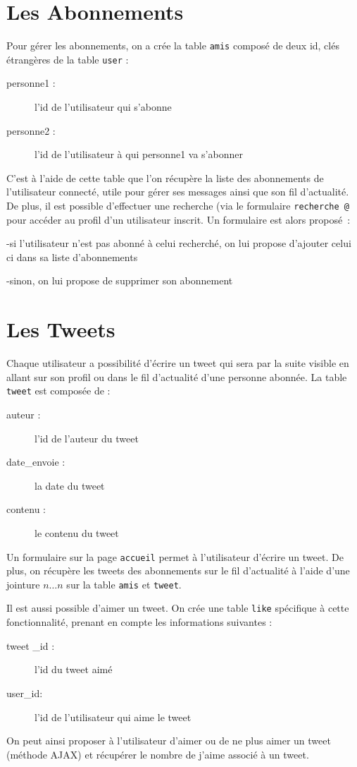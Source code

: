 \documentclass[a4paper, 12pt]{article}
\begin{document}
\section{Les Abonnements}	

Pour gérer les abonnements, on a crée la table \texttt{amis} composé de deux id, clés étrangères de la table \texttt{user} :
\begin{description}
\item[personne1 :] l’id de l’utilisateur qui s’abonne
\item[personne2 :] l’id de l’utilisateur à qui personne1 va s’abonner
\end{description}
C’est à l’aide de cette table que l’on récupère la liste des abonnements de l’utilisateur connecté, utile pour gérer ses messages ainsi que son fil d’actualité.
De plus, il est possible d’effectuer une recherche (via le formulaire \texttt{recherche @} pour accéder au profil d’un utilisateur inscrit. Un formulaire est alors proposé :
\item  -si l’utilisateur n’est pas abonné à celui recherché, on lui propose d’ajouter celui ci dans sa liste d’abonnements
\item -sinon, on lui propose de supprimer son abonnement 
\section{Les Tweets}			
Chaque utilisateur a possibilité d'écrire un tweet qui sera par la suite visible en allant sur son profil ou dans le fil d'actualité d'une personne abonnée. La table \texttt{tweet} est composée de :
\begin{description}
\item[auteur :] l’id de l’auteur du tweet
\item[date\_envoie :] la date du tweet
\item[contenu :] le contenu du tweet
\end{description}
Un formulaire sur la page \texttt{accueil} permet à l’utilisateur d’écrire un tweet.
De plus, on récupère les tweets des abonnements sur le fil d’actualité à l’aide d'une  jointure $n…n$ sur la table \texttt{amis} et \texttt{tweet}.

Il est aussi possible d'aimer un tweet. On crée une table \texttt{like} spécifique à cette fonctionnalité, prenant en compte les informations suivantes :
\begin{description}
\item[tweet \_id :] l’id du tweet aimé
\item[user\_id:] l'id de l'utilisateur qui aime le tweet
\end{description}
On peut ainsi proposer à l'utilisateur d'aimer ou de ne plus aimer un tweet (méthode AJAX) et récupérer le nombre de j'aime associé à un tweet.
\end{document}

